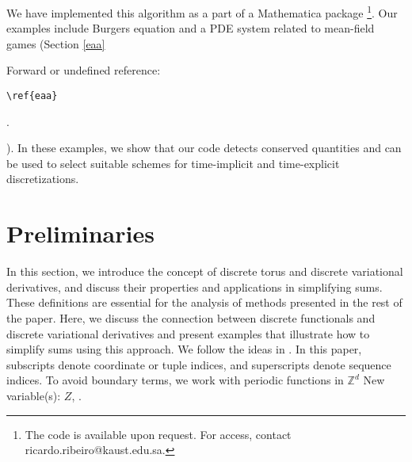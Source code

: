 \documentclass[runningheads]{llncs}
\newcommand{\1}{\chi}
\begin{document}
 We have implemented this algorithm as a part of a {\sc Mathematica} package \cite{wolfram21}\footnote{The code is available upon request. For access, contact ricardo.ribeiro@kaust.edu.sa.}. Our examples include Burgers equation and a PDE system related to mean-field games (Section \ref{eaa}
 {\color{red} Forward or undefined reference: \begin{verbatim}\ref{eaa}\end{verbatim}.}
). In these examples, 
 we show that our code detects conserved quantities and can be used to select suitable schemes for time-implicit and time-explicit discretizations. 

\section{Preliminaries}
\label{assp}

In this section, we introduce the concept of discrete torus and discrete variational derivatives, and discuss their properties and applications in simplifying sums. 
These definitions are essential for the analysis of methods presented in the rest of the paper.
Here, we 
discuss the connection between discrete functionals and discrete variational derivatives and present examples that illustrate how to simplify sums using this approach.
We follow the ideas in \cite{gomes20}.
In this paper, subscripts denote coordinate or tuple indices, and superscripts denote sequence indices.
To avoid boundary terms, we work with periodic functions in \({\mathbb{Z}}^d\)
{\color{blue} New variable(s): \(Z\),  }
.
\end{document}
